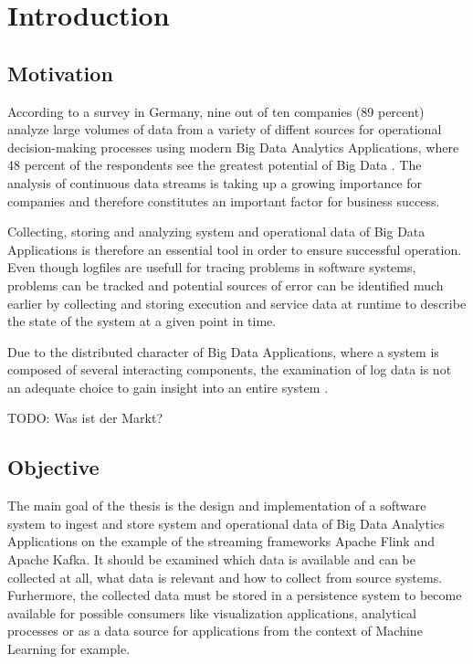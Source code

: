 \chapter{Introduction}

\section{Motivation}
According to a survey in Germany, nine out of ten companies (89 percent) analyze large
volumes of data from a variety of diffent sources for operational decision-making processes
using modern Big Data Analytics Applications, where 48 percent of the respondents see the
greatest potential of Big Data \cite{Bitk14}. The analysis of continuous data streams is
taking up a growing importance for companies and therefore constitutes an important factor
for business success.

Collecting, storing and analyzing system and operational data of Big Data Applications is
therefore an essential tool in order to ensure successful operation. Even though logfiles are
usefull for tracing problems in software systems, problems can be tracked and potential sources
of error can be identified much earlier by collecting and storing execution and service data at
runtime to describe the state of the system at a given point in time.

Due to the distributed character of Big Data Applications, where a system is composed of several
interacting components, the examination of log data is not an adequate choice to gain insight
into an entire system \cite{VanL14}.

TODO: Was ist der Markt?

\section{Objective}

The main goal of the thesis is the design and implementation of a software system to ingest
and  store system and operational data of Big Data Analytics Applications on the example of
the streaming frameworks Apache Flink and Apache Kafka. It should be examined which data is
available and can be collected at all, what data is relevant and how to collect from source
systems. Furhermore, the collected data must be stored in a persistence system to become
available for possible consumers like visualization applications, analytical processes or as
a data source for applications from the context of Machine Learning for example.

